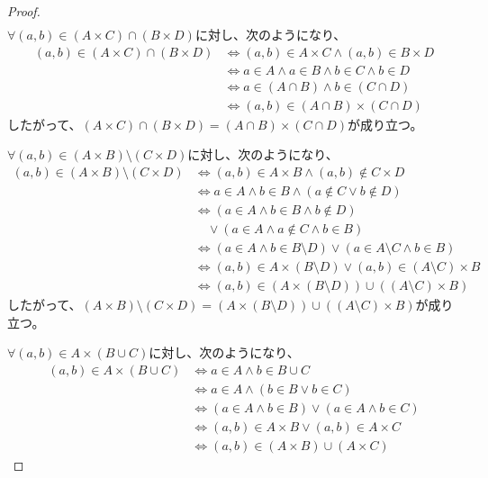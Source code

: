 \documentclass[a4paper]{jsarticle}
\begin{document}
\begin{proof}
\begin{align*}
\end{align*}
$\forall(a,b) \in (A \times C) \cap (B \times D)$に対し、次のようになり、
\begin{align*}
(a,b) \in (A \times C) \cap (B \times D) &\Leftrightarrow (a,b) \in A \times C \land (a,b) \in B \times D\\
&\Leftrightarrow a \in A \land a \in B \land b \in C \land b \in D\\
&\Leftrightarrow a \in (A \cap B) \land b \in (C \cap D)\\
&\Leftrightarrow (a,b) \in (A \cap B) \times (C \cap D)
\end{align*}
したがって、$(A \times C) \cap (B \times D) = (A \cap B) \times (C \cap D)$が成り立つ。\par
$\forall(a,b) \in (A \times B) \setminus (C \times D)$に対し、次のようになり、
\begin{align*}
(a,b) \in (A \times B) \setminus (C \times D) &\Leftrightarrow (a,b) \in A \times B \land (a,b) \notin C \times D\\
&\Leftrightarrow a \in A \land b \in B \land (a \notin C \vee b \notin D)\\
&\Leftrightarrow (a \in A \land b \in B \land b \notin D) \\
&\quad \vee (a \in A \land a \notin C \land b \in B)\\
&\Leftrightarrow (a \in A \land b \in B \setminus D) \vee (a \in A \setminus C \land b \in B)\\
&\Leftrightarrow (a,b) \in A \times (B \setminus D) \vee (a,b) \in (A \setminus C) \times B\\
&\Leftrightarrow (a,b) \in \left( A \times (B \setminus D) \right) \cup \left( (A \setminus C) \times B \right)
\end{align*}
したがって、$(A \times B) \setminus (C \times D) = \left( A \times (B \setminus D) \right) \cup \left( (A \setminus C) \times B \right)$が成り立つ。\par
$\forall(a,b) \in A \times (B \cup C)$に対し、次のようになり、
\begin{align*}
(a,b) \in A \times (B \cup C) &\Leftrightarrow a \in A \land b \in B \cup C\\
&\Leftrightarrow a \in A \land (b \in B \vee b \in C)\\
&\Leftrightarrow (a \in A \land b \in B) \vee (a \in A \land b \in C)\\
&\Leftrightarrow (a,b) \in A \times B \vee (a,b) \in A \times C\\
&\Leftrightarrow (a,b) \in (A \times B) \cup (A \times C)

\end{align*}
\end{proof}
\end{document}
